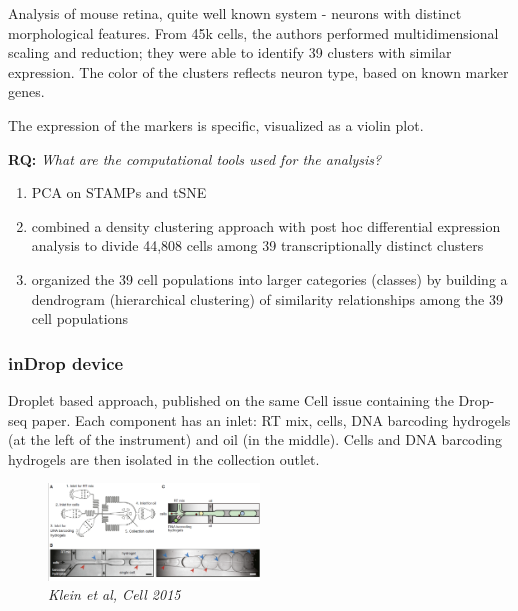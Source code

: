 Analysis of mouse retina, quite well known system - neurons with
distinct morphological features. From 45k cells, the authors performed
multidimensional scaling and reduction; they were able to identify 39
clusters with similar expression. The color of the clusters reflects
neuron type, based on known marker genes.

The expression of the markers is specific, visualized as a violin plot.

\begin{tcolorbox}
[width=\linewidth, sharp corners=all, colback=white!95!black]

\textbf{RQ: }
\emph{What are the computational tools used for the analysis?}

\begin{enumerate}
\def\labelenumi{\arabic{enumi}.}
\tightlist
\item
  PCA on STAMPs and tSNE
\item
  combined a density clustering approach with post hoc differential
  expression analysis to divide 44,808 cells among 39 transcriptionally
  distinct clusters
\item
  organized the 39 cell populations into larger categories (classes) by
  building a dendrogram (hierarchical clustering) of similarity
  relationships among the 39 cell populations
\end{enumerate}
\end{tcolorbox}

\hypertarget{indrop-device}{%
\subsubsection{inDrop device}\label{indrop-device}}

Droplet based approach, published on the same Cell issue containing the
Drop-seq paper. Each component has an inlet: RT mix, cells, DNA
barcoding hydrogels (at the left of the instrument) and oil (in the
middle). Cells and DNA barcoding hydrogels are then isolated in the
collection outlet.

\begin{figure}
\centering
\includegraphics[width=0.5\textwidth]{images/Screen_Shot_2023-02-21_at_20-02-42.png}
\caption{\emph{Klein et al, Cell 2015}}
\end{figure}

